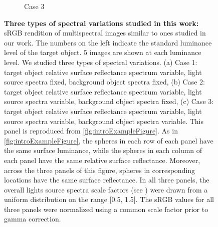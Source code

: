 \documentclass{jov}
\begin{document}
\begin{figure}
\begin{subfigure}[b]{0.33 \textwidth}
        \caption{Case 3}
        \label{fig:allSpectraVarying}
    \end{subfigure}    
    \caption{{\bf Three types of spectral variations studied in this work:} sRGB rendition of multispectral images similar to ones studied in our work. The numbers on the left indicate the standard luminance level of the target object. 5 images are shown at each luminance level. We studied three types of spectral variations. (a) Case 1: target object relative surface reflectance spectrum variable, light source spectra fixed, background object spectra fixed, (b) Case 2: target object relative surface reflectance spectrum variable, light source spectra variable, background object spectra fixed, (c) Case 3: target object relative surface reflectance spectrum variable, light source spectra variable, background object spectra variable. This panel is reproduced from \ref{fig:introExampleFigure}. As in \ref{fig:introExampleFigure}, the spheres in each row of each panel have the same surface luminance, while the spheres in each column of each panel have the same relative surface reflectance.  Moreover, across the three panels of this figure, spheres in corresponding locations have the same surface reflectance. In all three panels, the overall lights source spectra scale factors (see ) were drawn from a uniform distribution on the range [0.5, 1.5]. The sRGB values for all three panels were normalized using a common scale factor prior to gamma correction.} 
\label{fig:studiedCases}
\end{figure}
\end{document}
